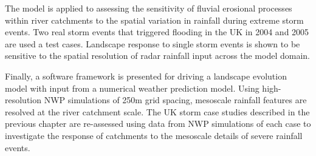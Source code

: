 The model is applied to assessing the sensitivity of fluvial erosional processes within river catchments to the spatial variation in rainfall during extreme storm events. Two real storm events that triggered flooding in the UK in 2004 and 2005 are used a test cases. Landscape response to single storm events is shown to be sensitive to the spatial resolution of radar rainfall input across the model domain.

Finally, a software framework is presented for driving a landscape evolution model with input from a numerical weather prediction model. Using high-resolution NWP simulations of 250m grid spacing, mesoscale rainfall features are resolved at the river catchment scale. The UK storm case studies described in the previous chapter are re-assessed using data from NWP simulations of each case to investigate the response of catchments to the mesoscale details of severe rainfall events.


%
%
%

\afterabstract
%
%


